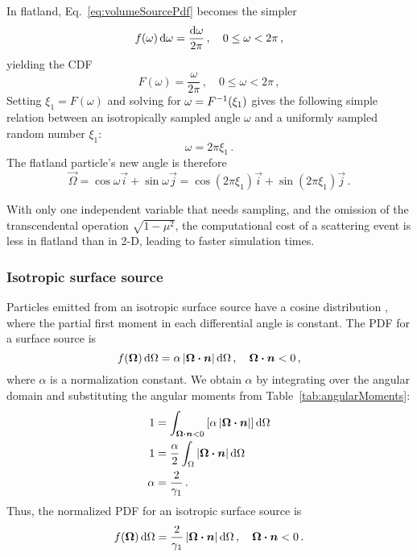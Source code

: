 In flatland, Eq.~\eqref{eq:volumeSourcePdf} becomes the simpler
\begin{equation*}
  f(\omega) \mathop{}\!\mathrm{d}\omega = \frac{\mathop{}\!\mathrm{d}\omega}{2\pi} \,,
  \quad 0 \le \omega < 2\pi\,,
\end{equation*}
yielding the CDF
\begin{equation}\label{eq:volumeSourceFlatland}
  F(\omega) = \frac{\omega}{2\pi}\,,
  \quad 0 \le \omega < 2\pi\,,
\end{equation}
Setting $\xi_1 = F(\omega)$ and solving for $\omega = F^{-1}(\xi_1)$ gives the
following simple relation between an isotropically sampled angle $\omega$ and a
uniformly sampled random number $\xi_1$:
\begin{equation*}
  \omega = 2\pi \xi_1\,.
\end{equation*}
The flatland particle's new angle is therefore
\begin{equation*}
  \vec{\Omega} = \cos \omega \vec{i} + \sin \omega \vec{j}
  = \cos(2\pi\xi_1) \vec{i} + \sin(2\pi\xi_1) \vec{j}\,.
\end{equation*}

With only one independent variable that needs sampling, and the omission of
the transcendental operation $\sqrt{1-\mu^2}$, the computational cost of a
scattering event is less in flatland than in 2-D, leading to
faster simulation times.

\subsubsection{Isotropic surface source}\label{sec:isoSurface}
Particles emitted from an isotropic surface source have a cosine distribution
\cite{Gre2002}, where the partial first moment in each differential angle is
constant. The PDF for a surface source is
\begin{equation*}
  f(\bm{\Omega}) \mathop{}\!\mathrm{d}\Omega = \alpha \left| \bm{\Omega}\bm{\cdot} \bm{n} \right| \mathop{}\!\mathrm{d}\Omega \,,
\quad \bm{\Omega}\bm{\cdot} \bm{n} < 0 \,,
\end{equation*}
where $\alpha$ is a normalization constant. We obtain $\alpha$ by integrating over
the angular domain and substituting the angular moments from Table~\ref{tab:angularMoments}:
\begin{align*}
  1 &= \int_{\bm{\Omega}\bm{\cdot} \bm{n} < 0} \left[ \alpha \left| \bm{\Omega}\bm{\cdot}
  \bm{n} \right| \right] \mathop{}\!\mathrm{d}\Omega
  \\
  1 &=\frac{\alpha}{2} \int_{\Omega} \left| \bm{\Omega}\bm{\cdot} \bm{n} \right| \mathop{}\!\mathrm{d}\Omega
  \\
  \alpha &= \frac{2}{\gamma_1}\,.
\end{align*}
Thus, the normalized PDF for an isotropic surface source is
\begin{equation}\label{eq:surfaceSourcePdf}
  f(\bm{\Omega}) \mathop{}\!\mathrm{d}\Omega = \frac{2}{\gamma_1} \left| \bm{\Omega}\bm{\cdot} \bm{n} \right| \mathop{}\!\mathrm{d}\Omega \,,
\quad \bm{\Omega}\bm{\cdot} \bm{n} < 0 \,.
\end{equation}

